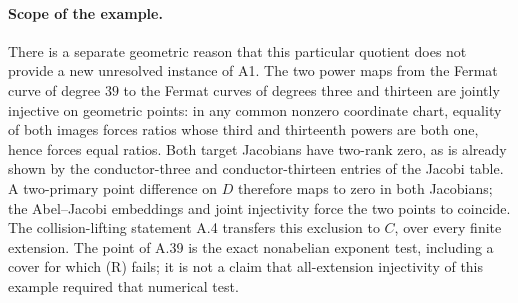 \documentclass[11pt]{article}
\begin{document}
\paragraph{Scope of the example.}
There is a separate geometric reason that this particular
quotient does not provide a new unresolved instance of A1.
The two power maps from the Fermat curve of degree \(39\)
to the Fermat curves of degrees three and thirteen are
jointly injective on geometric points: in any common
nonzero coordinate chart, equality of both images forces
ratios whose third and thirteenth powers are both one,
hence forces equal ratios. Both target Jacobians have
two-rank zero, as is already shown by the conductor-three
and conductor-thirteen entries of the Jacobi table.
A two-primary point difference on \(D\) therefore maps
to zero in both Jacobians; the Abel--Jacobi embeddings
and joint injectivity force the two points to coincide.
The collision-lifting statement A.4 transfers this
exclusion to \(C\), over every finite extension. The
point of A.39 is the exact nonabelian exponent test,
including a cover for which (R) fails; it is not a claim
that all-extension injectivity of this example required
that numerical test.
\end{document}
